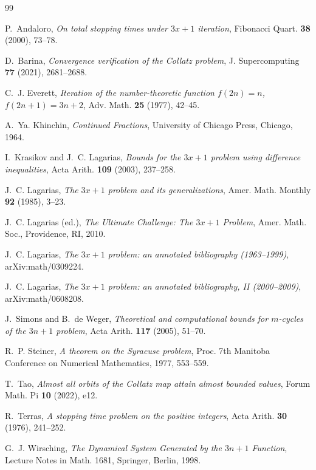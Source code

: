 \documentclass[11pt]{article}
\theoremstyle{definition}
\theoremstyle{remark}
\begin{document}
\begin{thebibliography}{99}

P.~Andaloro,
\emph{On total stopping times under $3x+1$ iteration},
Fibonacci Quart. \textbf{38} (2000), 73--78.

D.~Barina,
\emph{Convergence verification of the Collatz problem},
J. Supercomputing \textbf{77} (2021), 2681--2688.

C.~J. Everett,
\emph{Iteration of the number-theoretic function $f(2n)=n$,
$f(2n+1)=3n+2$},
Adv. Math. \textbf{25} (1977), 42--45.

A.~Ya. Khinchin,
\emph{Continued Fractions},
University of Chicago Press, Chicago, 1964.

I.~Krasikov and J.~C. Lagarias,
\emph{Bounds for the $3x+1$ problem using difference inequalities},
Acta Arith. \textbf{109} (2003), 237--258.

J.~C. Lagarias,
\emph{The $3x+1$ problem and its generalizations},
Amer. Math. Monthly \textbf{92} (1985), 3--23.

J.~C. Lagarias (ed.),
\emph{The Ultimate Challenge: The $3x+1$ Problem},
Amer. Math. Soc., Providence, RI, 2010.

J.~C. Lagarias,
\emph{The $3x+1$ problem: an annotated bibliography (1963--1999)},
arXiv:math/0309224.

J.~C. Lagarias,
\emph{The $3x+1$ problem: an annotated bibliography, II (2000--2009)},
arXiv:math/0608208.

J.~Simons and B.~de Weger,
\emph{Theoretical and computational bounds for $m$-cycles of the $3n+1$
problem},
Acta Arith. \textbf{117} (2005), 51--70.

R.~P. Steiner,
\emph{A theorem on the Syracuse problem},
Proc. 7th Manitoba Conference on Numerical Mathematics, 1977,
553--559.

T.~Tao,
\emph{Almost all orbits of the Collatz map attain almost bounded
values},
Forum Math. Pi \textbf{10} (2022), e12.

R.~Terras,
\emph{A stopping time problem on the positive integers},
Acta Arith. \textbf{30} (1976), 241--252.

G.~J. Wirsching,
\emph{The Dynamical System Generated by the $3n+1$ Function},
Lecture Notes in Math. 1681, Springer, Berlin, 1998.

\end{thebibliography}
\end{document}
